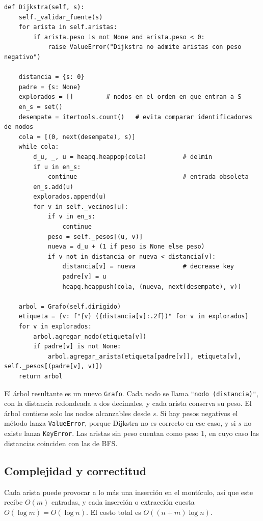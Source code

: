 \documentclass[11pt,letterpaper]{article}
\begin{document}
\begin{lstlisting}[caption={Método \texttt{Dijkstra}.}]
def Dijkstra(self, s):
    self._validar_fuente(s)
    for arista in self.aristas:
        if arista.peso is not None and arista.peso < 0:
            raise ValueError("Dijkstra no admite aristas con peso negativo")

    distancia = {s: 0}
    padre = {s: None}
    explorados = []         # nodos en el orden en que entran a S
    en_s = set()
    desempate = itertools.count()   # evita comparar identificadores de nodos
    cola = [(0, next(desempate), s)]
    while cola:
        d_u, _, u = heapq.heappop(cola)          # delmin
        if u in en_s:
            continue                             # entrada obsoleta
        en_s.add(u)
        explorados.append(u)
        for v in self._vecinos[u]:
            if v in en_s:
                continue
            peso = self._pesos[(u, v)]
            nueva = d_u + (1 if peso is None else peso)
            if v not in distancia or nueva < distancia[v]:
                distancia[v] = nueva             # decrease key
                padre[v] = u
                heapq.heappush(cola, (nueva, next(desempate), v))

    arbol = Grafo(self.dirigido)
    etiqueta = {v: f"{v} ({distancia[v]:.2f})" for v in explorados}
    for v in explorados:
        arbol.agregar_nodo(etiqueta[v])
        if padre[v] is not None:
            arbol.agregar_arista(etiqueta[padre[v]], etiqueta[v], self._pesos[(padre[v], v)])
    return arbol
\end{lstlisting}

El árbol resultante es un nuevo \texttt{Grafo}. Cada nodo se llama
\texttt{"nodo (distancia)"}, con la distancia redondeada a dos decimales, y cada
arista conserva su peso. El árbol contiene solo los nodos alcanzables desde $s$.
Si hay pesos negativos el método lanza \texttt{ValueError}, porque Dijkstra no es
correcto en ese caso, y si $s$ no existe lanza \texttt{KeyError}. Las aristas sin
peso cuentan como peso 1, en cuyo caso las distancias coinciden con las de BFS.

\subsection{Complejidad y correctitud}

Cada arista puede provocar a lo más una inserción en el montículo, así que este
recibe $O(m)$ entradas, y cada inserción o extracción cuesta $O(\log m) = O(\log n)$.
El costo total es $O((n + m) \log n)$.
\end{document}
